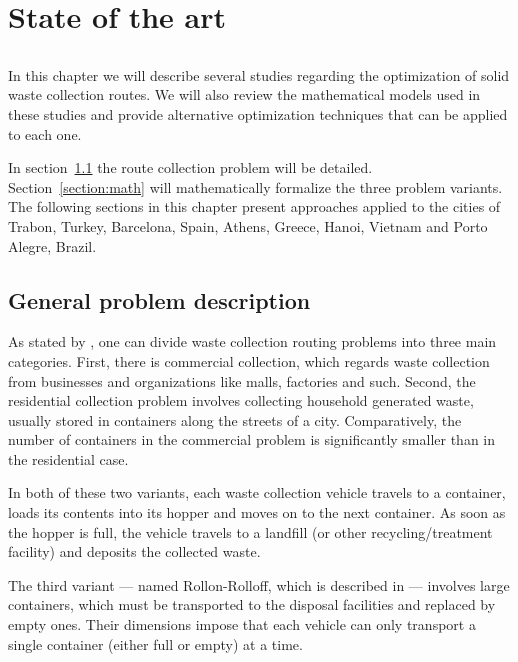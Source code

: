 \chapter{State of the art} \label{chap:sota}

\section*{}

In this chapter we will describe several studies regarding the optimization of
solid waste collection routes. We will also review the mathematical models used
in these studies and provide alternative optimization techniques that can be
applied to each one.

In section~\ref{section:problem} the route collection problem will be detailed.
Section~\ref{section:math} will mathematically formalize the three problem
variants. The following sections in this  chapter present approaches applied to
the cities of Trabon, Turkey\citep{Apaydin2007}, Barcelona,
Spain\citep{Bautista2004}, Athens, Greece\citep{Karadimas2005}, Hanoi,
Vietnam\citep{Tung2000} and Porto Alegre, Brazil\citep{Li2008}. 

\section{General problem description}
\label{section:problem}

As stated by \citet{Golden01}, one can divide waste collection routing problems
into three main categories. First, there is commercial collection, which
regards waste collection from businesses and organizations like malls,
factories and such. Second, the residential collection problem involves
collecting household generated waste, usually stored in containers along the
streets of a city.  Comparatively, the number of containers in the commercial
problem is significantly smaller than in the residential case.

In both of these two variants, each waste collection vehicle travels to a
container, loads its contents into its hopper and moves on to the next
container. As soon as the hopper is full, the vehicle travels to a landfill (or
other recycling/treatment facility) and deposits the collected waste.

The third variant --- named Rollon-Rolloff, which is described in
\cite{Bodin00} --- involves large containers, which must be transported
to the disposal facilities and replaced by empty ones. Their dimensions impose
that each vehicle can only transport a single container (either full or empty)
at a time. 

